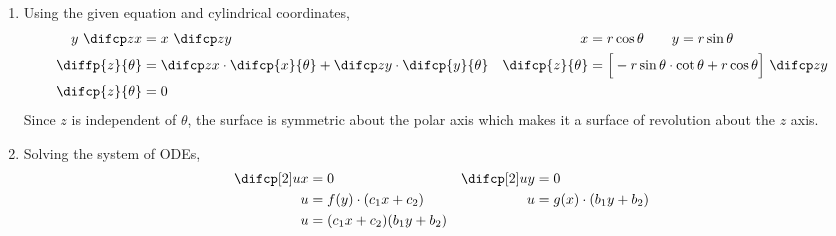 \begin{enumerate}
    \item Using the given equation and cylindrical coordinates,
          \begin{align}
              y\ \difcp zx       & = x\ \difcp zy                         &
              x                  & = r\cos \theta \qquad y = r\sin \theta   \\
              \diffp {z}{\theta} & = \difcp zx \cdot \difcp {x}{\theta}
              + \difcp zy \cdot
              \difcp {y}{\theta} &
              \difcp {z}{\theta} & = \Big[-r\sin \theta \cdot \cot \theta
              + r\cos \theta\Big]\ \difcp zy                                \\
              \difcp{z}{\theta}  & = 0
          \end{align}
          Since $ z $ is independent of $ \theta $, the surface is symmetric about the
          polar axis which makes it a surface of revolution about the $ z $ axis.

    \item Solving the system of ODEs,
          \begin{align}
              \difcp[2] ux & = 0                        &
              \difcp[2] uy & = 0                          \\
              u            & = f(y) \cdot (c_1 x + c_2) &
              u            & = g(x) \cdot (b_1y + b_2)    \\
              u            & = (c_1x + c_2)(b_1y + b_2)
          \end{align}
\end{enumerate}